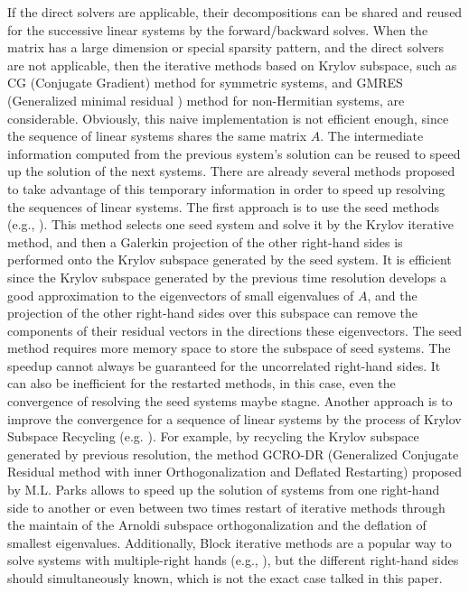 If the direct solvers are applicable, their decompositions can be shared and reused for the successive linear systems by the forward/backward solves. When the matrix has a large dimension or special sparsity pattern, and the direct solvers are not applicable, then the iterative methods based on Krylov subspace, such as CG (Conjugate Gradient) method \cite{kershaw1978incomplete} for symmetric systems, and GMRES (Generalized minimal residual ) method \cite{saad1986gmres} for non-Hermitian systems, are considerable. Obviously, this naive implementation is not efficient enough, since the sequence of linear systems shares the same matrix $A$. The intermediate information computed from the previous system's solution can be reused to speed up the solution of the next systems. There are already several methods proposed to take advantage of this temporary information in order to speed up resolving the sequences of linear systems. The first approach is to use the seed methods (e.g., \cite{saad1987lanczos,papadrakakis1990new,smith1989conjugate,gu2002seed,simoncini1995iterative,abdel2014improved}). This method selects one seed system and solve it by the Krylov iterative method, and then a Galerkin projection of the other right-hand sides is performed onto the Krylov subspace generated by the seed system. It is efficient since the Krylov subspace generated by the previous time resolution develops a good approximation to the eigenvectors of small eigenvalues of $A$, and the projection of the other right-hand sides over this subspace can remove the components of their residual vectors in the directions these eigenvectors. The seed method requires more memory space to store the subspace of seed systems. The speedup cannot always be guaranteed for the uncorrelated right-hand sides.  It can also be inefficient for the restarted methods, in this case, even the convergence of resolving the seed systems maybe stagne. Another approach is to improve the convergence for a sequence of linear systems by the process of Krylov Subspace Recycling (e.g. \cite{parks2006recycling,jolivet2016block,kilmer2006recycling,ye2008generalized}). For example, by recycling the Krylov subspace generated by previous resolution, the method GCRO-DR (Generalized Conjugate Residual method with inner Orthogonalization and Deflated Restarting) proposed by M.L. Parks \cite{parks2006recycling} allows to speed up the solution of systems from one right-hand side to another or even between two times restart of iterative methods through the maintain of the Arnoldi subspace orthogonalization and the deflation of smallest eigenvalues. Additionally, Block iterative methods are a popular way to solve systems with multiple-right hands (e.g., \cite{simoncini1995iterative,calvetti1994application, baker2006improving,gutknecht2006block}), but the different right-hand sides should simultaneously known, which is not the exact case talked in this paper. 

